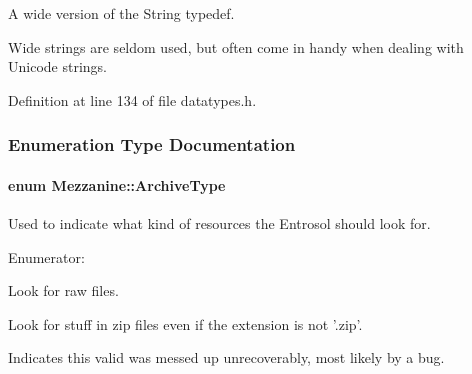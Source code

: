 A wide version of the String typedef. 

Wide strings are seldom used, but often come in handy when dealing with Unicode strings. 

Definition at line 134 of file datatypes.\-h.



\subsubsection{Enumeration Type Documentation}
\hypertarget{namespaceMezzanine_a25d7f893350196fa99e164f78df3538b}{
\paragraph[{Archive\-Type}]{\setlength{\rightskip}{0pt plus 5cm}enum {\bf Mezzanine\-::\-Archive\-Type}}}\label{namespaceMezzanine_a25d7f893350196fa99e164f78df3538b}


Used to indicate what kind of resources the Entrosol should look for. 

\begin{Desc}
\item[Enumerator\-: ]\par
\begin{description}
\item[{\em 
\hypertarget{namespaceMezzanine_a25d7f893350196fa99e164f78df3538ba7d47095245d0d616e56790ddb06978c9}{File\-System}\label{namespaceMezzanine_a25d7f893350196fa99e164f78df3538ba7d47095245d0d616e56790ddb06978c9}
}]Look for raw files. \item[{\em 
\hypertarget{namespaceMezzanine_a25d7f893350196fa99e164f78df3538ba43428c8ab05d1ac46abc95c021496360}{Zip}\label{namespaceMezzanine_a25d7f893350196fa99e164f78df3538ba43428c8ab05d1ac46abc95c021496360}
}]Look for stuff in zip files even if the extension is not '.zip'. \item[{\em 
\hypertarget{namespaceMezzanine_a25d7f893350196fa99e164f78df3538bac1790df125a6142b8a5b550c95763de5}{Invalid}\label{namespaceMezzanine_a25d7f893350196fa99e164f78df3538bac1790df125a6142b8a5b550c95763de5}
}]Indicates this valid was messed up unrecoverably, most likely by a bug. \end{description}
\end{Desc}



